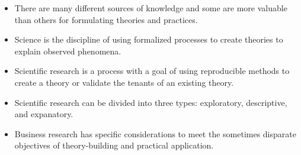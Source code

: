 \begin{itemize}
	\item There are many different sources of knowledge and some are more valuable than others for formulating theories and practices.

	\item Science is the discipline of using formalized processes to create theories to explain observed phenomena.

	\item Scientific research is a process with a goal of using reproducible methods to create a theory or validate the tenants of an existing theory.

	\item Scientific research can be divided into three types: exploratory, descriptive, and expanatory.

	\item Business research has specific considerations to meet the sometimes disparate objectives of theory-building and practical application.
\end{itemize}